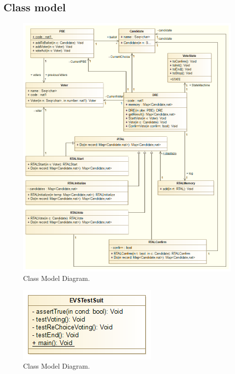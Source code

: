 \documentclass{article}
\begin{document}
\subsection{Class model}
\begin{figure}[H]
\centering
	\includegraphics[width=\textwidth,height=\textheight,keepaspectratio]{uml.png}
	\caption{Class Model Diagram.}
	\label{fig:PropProf}
\end{figure}
\begin{figure}[H]
\centering
	\includegraphics[scale=0.7]{test.png}
	\caption{Class Model Diagram.}
	\label{fig:PropProf}
\end{figure}
\end{document}
